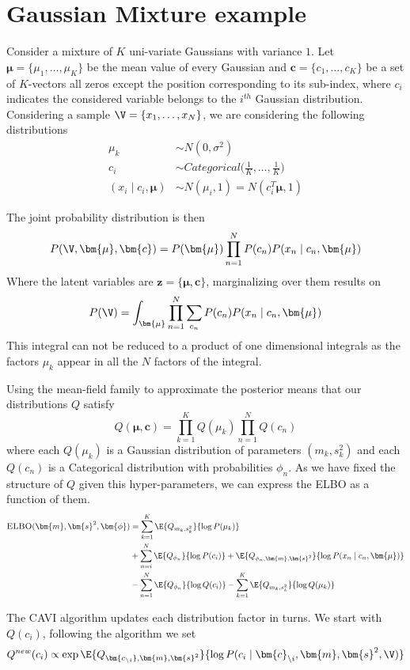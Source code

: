 
\section{Gaussian Mixture example}

\begin{exampleth}
  Consider a mixture of \(K\) uni-variate Gaussians with variance \(1\). Let \(\bm{\mu} = \{\mu_{1},\dots, \mu_{K}\}\) be the mean value of every Gaussian and \(\bm{c} = \{c_{1},\dots, c_{K}\}\) be a set of \(K\)-vectors all zeros except the position corresponding to its sub-index, where \(c_{i}\) indicates the considered variable belongs to the \(i^{th}\) Gaussian distribution. Considering a sample \(\V = \{x_{1}, \dots, x_{N}\}\), we are considering the following distributions
  \[
    \begin{aligned}
      \mu_{k} &\sim N(0, \sigma^{2})\\
      c_{i} &\sim Categorical \Big( \frac{1}{K},\dots,\frac{1}{K} \Big)\\
      (x_{i} \mid c_{i}, \bm{\mu}) &\sim N(\mu_{i}, 1) = N(c_{i}^{T}\bm{\mu}, 1)
    \end{aligned}
  \]

  The joint probability distribution is then
  \[
    P(\V, \bm{\mu}, \bm{c}) = P(\bm{\mu})\prod_{n=1}^{N}P(c_{n})P(x_{n}\mid c_{n}, \bm{\mu})
  \]
  Where the latent variables are \(\bm{z} = \{\bm{\mu}, \bm{c}\}\), marginalizing over them results on
  \[
    P(\V) = \int_{\bm{\mu}}\prod_{n=1}^{N}\sum_{c_{n}}P(c_{n})P(x_{n} \mid c_{n},\bm{\mu})
  \]
  This integral can not be reduced to a product of one dimensional integrals as the factors \(\mu_{k}\) appear in all the \(N\) factors of the integral.

  Using the mean-field family to approximate the posterior means that our distributions \(Q\) satisfy
  \[
    Q(\bm{\mu}, \bm{c}) = \prod_{k = 1}^{K}Q(\mu_{k})\prod_{n=1}^{N}Q(c_{n})
  \]
  where each \(Q(\mu_{k})\) is a Gaussian distribution of parameters \((m_{k}, s_{k}^{2})\)  and each \(Q(c_{n})\) is a Categorical distribution with probabilities \(\phi_{n}\). As we have fixed the structure of \(Q\) given this hyper-parameters, we can express the ELBO as a function of them.
  \[
    \begin{aligned}
      \textsc{ELBO}(\bm{m}, \bm{s}^{2}, \bm{\phi}) &= \sum_{k=1}^{K}\E{Q_{m_{k},s_{k}^{2}}}{\log{P(\mu_{k})}}\\
      &+ \sum_{n=i}^{N} \E{Q_{\phi_{n}}}{\log{P(c_{i})}} + \E{Q_{\phi_{n}, \bm{m}, \bm{s}^{2}}}{\log{P(x_{n}\mid c_{n}, \bm{\mu})}}\\
      &- \sum_{n=1}^{N} \E{Q_{\phi_{n}}}{\log{Q(c_{i})}} - \sum_{k=1}^{K}\E{Q_{m_{k},s_{k}^{2}}}{\log{Q(\mu_{k})}}
     \end{aligned}
   \]

   The CAVI algorithm updates each distribution factor in turns. We start with \(Q(c_{i})\), following the algorithm we set
   \[
     Q^{new}(c_{i}) \propto \exp{ \E{Q_{\bm{c_{\backslash i}}, \bm{m}, \bm{s}^{2}}}{\log{ P(c_{i}\mid \bm{c}_{\backslash i}, \bm{m}, \bm{s}^{2}, \V) }} }
   \]

\end{exampleth}
